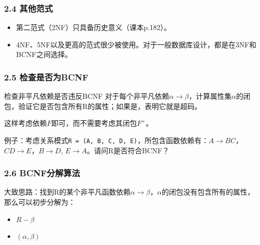 \documentclass[aspectratio=169, 14pt]{beamer}
\begin{document}
\begin{frame}
    \frametitle{2.4 其他范式}
\begin{itemize}
    \item 第二范式（2NF）只具备历史意义（课本p.182）。
    \item 4NF、5NF以及更高的范式很少被使用。对于一般数据库设计，\alert{都是在3NF和BCNF之间选择。}
\end{itemize}
    

\end{frame}

\begin{frame}
    \frametitle{2.5 检查是否为BCNF}
\begin{exampleblock}{检查非平凡依赖是否违反BCNF}
    对于每个非平凡依赖$\alpha \rightarrow \beta$，计算属性集$\alpha$的闭包，验证它是否包含所有R的属性；如果是，表明它就是超码。    
\end{exampleblock}
这样考虑依赖$F$即可，而不需要考虑其闭包$F^+$。

\pause 
{} 例子：考虑关系模式\texttt{R = (A, B, C, D, E)}，所包含函数依赖有：$A \rightarrow BC$，$CD \rightarrow E$，$B \rightarrow D$, $E \rightarrow A$。请问R是否符合BCNF？

\end{frame}

\begin{frame}
    \frametitle{2.6 BCNF分解算法}
大致思路：找到R的某个非平凡函数依赖$\alpha \rightarrow \beta$，$\alpha$的闭包没有包含所有的属性，那么可以初步分解为：

\begin{itemize}
    \item $R - \beta$
    \item $(\alpha, \beta)$
\end{itemize}

\end{frame}

\begin{frame}
\end{frame}
\end{document}
